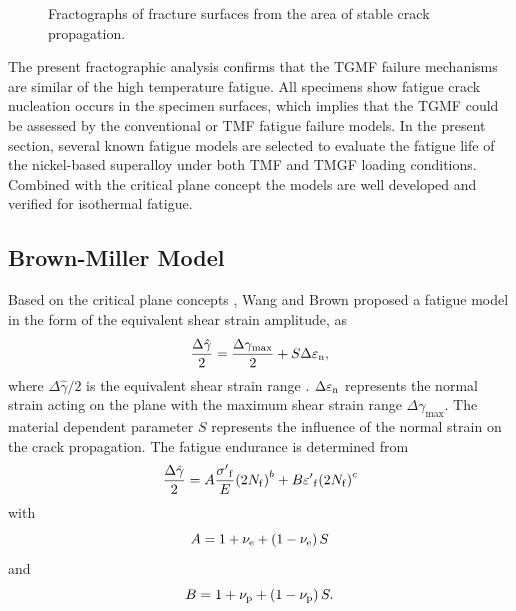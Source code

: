 \documentclass[preprint,5p,twocolumn,10pt,sort&compress]{elsarticle}
\begin{document}
\begin{figure}[!ht]
  \caption{Fractographs of fracture surfaces from the area of stable crack propagation.}
  \label{Fig:fatigue_striations_TGMF}
\end{figure}

The present fractographic analysis confirms that the TGMF failure mechanisms are similar of the high temperature fatigue. All specimens show fatigue crack nucleation occurs in the specimen surfaces, which implies that the TGMF could be assessed by the conventional or TMF fatigue failure models. In the present section, several known fatigue models are selected to evaluate the fatigue life of the nickel-based superalloy under both TMF and TMGF loading conditions. Combined with the critical plane concept the models are well developed and verified for isothermal fatigue.


\subsection{Brown-Miller Model}
{Based on the critical plane concepts \cite{Brown2006}, Wang and Brown \cite{Wang1993} proposed a  fatigue model in the form of the equivalent shear strain amplitude}, as
\begin{equation}
\frac{{\Delta \hat \gamma }}{2} = \frac{{\Delta {\gamma _{\max}}}}{2} + S\Delta {\varepsilon _{\rm n}},
\label{Equ:ShearStrainBM}
\end{equation}
where ${{\Delta \hat \gamma }}/{2}$ is the equivalent shear strain range \cite{Wang1993}. $\Delta {\varepsilon _{\rm n}}$ represents the normal strain acting on the plane with the maximum shear strain range $\Delta {\gamma _{\max}}$. The material dependent parameter $S$ represents the influence of the normal strain on the crack propagation.
The fatigue endurance is determined from 
\begin{equation}
\frac{{\Delta \hat \gamma }}{2} = A\frac{{{{\sigma '}_{\rm f}}}}{E}{\left( {2{N_{\rm f}}} \right)^b} + B{{\varepsilon '}_{\rm f}}{\left( {2{N_{\rm f}}} \right)^c}
\end{equation}
with
\[A = 1 + {\nu _{\rm e}} + \left( {1 - {\nu _{\rm e}}} \right)S\]
and
\[B = 1 + {\nu _{\rm p}} + \left( {1 - {\nu _{\rm p}}} \right)S.\]
\end{document}
